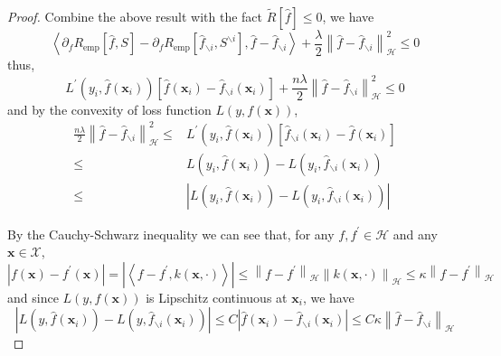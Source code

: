 \begin{proof}
	Combine the above result with the fact $\tilde{R}[\hat{f}]\leq 0$, we have
	\begin{equation}
		\left\langle\partial_{f}R_{\text{emp}}\left[\hat{f},S\right]-\partial_{f}R_{\text{emp}}\left[\hat{f}_{\backslash i},S^{\backslash i}\right],\hat{f}-\hat{f}_{\backslash i}\right\rangle+\frac{\lambda}{2}\left\|\hat{f}-\hat{f}_{\backslash i}\right\|_{\mathcal{H}}^{2}\leq 0
	\end{equation}
	thus,
	\begin{equation}
		L^{\prime}\left(y_{i},\hat{f}(\mathbf{x}_{i})\right)\left[\hat{f}(\mathbf{x}_{i})-\hat{f}_{\backslash i}(\mathbf{x}_{i})\right]+\frac{n\lambda}{2}\left\|\hat{f}-\hat{f}_{\backslash i}\right\|_{\mathcal{H}}^{2}\leq 0
	\end{equation}
	and by the convexity of loss function $L\left(y,f(\mathbf{x})\right)$,
	\begin{equation}
		\label{eq:rkhs-norm-by-derviative-of-tilde-R}
		\begin{aligned}
			\frac{n\lambda}{2}\left\|\hat{f}-\hat{f}_{\backslash i}\right\|_{\mathcal{H}}^{2}\leq & L^{\prime}\left(y_{i},\hat{f}(\mathbf{x}_{i})\right)\left[\hat{f}_{\backslash i}(\mathbf{x}_{i})-\hat{f}(\mathbf{x}_{i})\right] \\
			\leq                                                                                  & L\left(y_{i},\hat{f}(\mathbf{x}_{i})\right)-L\left(y_{i},\hat{f}_{\backslash i}(\mathbf{x}_{i})\right)                          \\
			\leq                                                                                  & \left|L\left(y_{i},\hat{f}(\mathbf{x}_{i})\right)-L\left(y_{i},\hat{f}_{\backslash i}(\mathbf{x}_{i})\right)\right|
		\end{aligned}
	\end{equation}

	By the Cauchy-Schwarz inequality we can see that, for any $f,f^{\prime}\in\mathcal{H}$ and any $\mathbf{x}\in\mathcal{X}$,
	\begin{equation}
		\left|f(\mathbf{x})-f^{\prime}(\mathbf{x})\right|=\left|\left\langle f-f^{\prime},k(\mathbf{x},\cdot)\right\rangle\right|\leq\left\|f-f^{\prime}\right\|_{\mathcal{H}}\left\|k(\mathbf{x},\cdot)\right\|_{\mathcal{H}}\leq\kappa\left\|f-f^{\prime}\right\|_{\mathcal{H}}
	\end{equation}
	and since $L\left(y,f(\mathbf{x})\right)$ is Lipschitz continuous at $\mathbf{x}_{i}$,  we have
	\begin{equation}
		\label{eq:rkhs-norm-by-lipshitz-continuous}
		\left|L\left(y,\hat{f}(\mathbf{x}_{i})\right)-L\left(y,\hat{f}_{\backslash i}(\mathbf{x}_{i})\right)\right|\leq C\left|\hat{f}(\mathbf{x}_{i})-\hat{f}_{\backslash i}(\mathbf{x}_{i})\right|\leq C\kappa\left\|\hat{f}-\hat{f}_{\backslash i}\right\|_{\mathcal{H}}
	\end{equation}


\end{proof}
